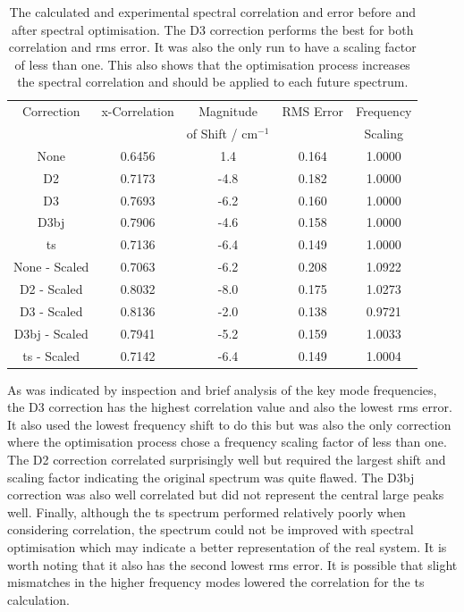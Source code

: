 \begin{table}[h]
\centering
\begin{tabular}{@{}ccccc@{}}
\toprule
Correction & x-Correlation & Magnitude & RMS Error & Frequency \\
 & & of Shift / cm\(^{-1}\) & & Scaling \\ \midrule
None &
  0.6456 &
  1.4 &
  0.164 &
  1.0000 \\
D2 &
  0.7173 &
  -4.8 &
  0.182 &
  1.0000 \\
D3 &
  0.7693 &
  -6.2 &
  0.160 &
  1.0000 \\
D3\acrshort{bj} &
  0.7906 &
  -4.6 &
  0.158 &
  1.0000 \\
\acrshort{ts} &
  0.7136 &
  -6.4 &
  0.149 &
  1.0000 \\ \midrule
None - Scaled &
  0.7063 &
  -6.2 &
  0.208 &
  1.0922 \\
D2 - Scaled &
  0.8032 &
  -8.0 &
  0.175 &
  1.0273 \\
D3 - Scaled  &
  0.8136 &
  -2.0 &
  0.138 &
  0.9721 \\
D3\acrshort{bj} - Scaled  &
  0.7941 &
  -5.2 &
  0.159 &
  1.0033 \\
\acrshort{ts} - Scaled  &
  0.7142 &
  -6.4 &
  0.149 &
  1.0004 \\ \bottomrule
\end{tabular}
\captionsetup{font = footnotesize, justification = centering}
\caption[The Calculated and Experimental Spectral Correlation and Error Before and After Spectral Optimisation]{The calculated and experimental spectral correlation and error before and after spectral optimisation. The D3 correction performs the best for both correlation and \acrshort{rms} error. It was also the only run to have a scaling factor of less than one. This also shows that the optimisation process increases the spectral correlation and should be applied to each future spectrum.}
\label{tab:calc_exp_corr}
\end{table}

As was indicated by inspection and brief analysis of the key mode frequencies, the D3 correction has the highest correlation value and also the lowest \acrshort{rms} error. It also used the lowest frequency shift to do this but was also the only correction where the optimisation process chose a frequency scaling factor of less than one. The D2 correction correlated surprisingly well but required the largest shift and scaling factor indicating the original spectrum was quite flawed. The D3\acrshort{bj} correction was also well correlated but did not represent the central large peaks well. Finally, although the \acrshort{ts} spectrum performed relatively poorly when considering correlation, the spectrum could not be improved with spectral optimisation which may indicate a better representation of the real system. It is worth noting that it also has the second lowest \acrshort{rms} error. It is possible that slight mismatches in the higher frequency modes lowered the correlation for the \acrshort{ts} calculation. 

